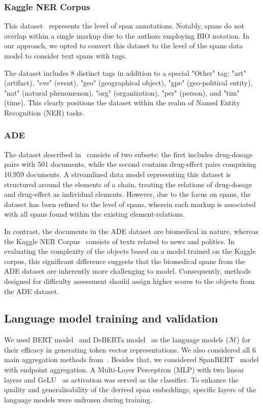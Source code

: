 \documentclass{article}
\begin{document}
\subsubsection{Kaggle NER Corpus}
This dataset~\cite{kagglener} represents the level of span annotations. Notably, spans do not overlap within a single markup due to the authors employing BIO notation. In our approach, we opted to convert this dataset to the level of the spans data model to consider text spans with tags.

The dataset includes 8 distinct tags in addition to a special "Other" tag: "art" (artifact), "eve" (event), "geo" (geographical object), "gpe" (geo-political entity), "nat" (natural phenomenon), "org" (organization), "per" (person), and "tim" (time). This clearly positions the dataset within the realm of Named Entity Recognition (NER) tasks.

\subsubsection{ADE}
The dataset described in~\cite{ade} consists of two subsets: the first includes drug-dosage pairs with 501 documents, while the second contains drug-effect pairs comprising 10,959 documents. A streamlined data model representing this dataset is structured around the elements of a chain, treating the relations of drug-dosage and drug-effect as individual elements. However, due to the focus on spans, the dataset has been refined to the level of spans, wherein each markup is associated with all spans found within the existing element-relations.

In contrast, the documents in the ADE dataset are biomedical in nature, whereas the Kaggle NER Corpus~\cite{kagglener} consists of texts related to news and politics. In evaluating the complexity of the objects based on a model trained on the Kaggle corpus, this significant difference suggests that the biomedical spans from the ADE dataset are inherently more challenging to model. Consequently, methods designed for difficulty assessment should assign higher scores to the objects from the ADE dataset.

\subsection{Language model training and validation}
We used BERT model~\cite{devlin2019bert} and DeBERTa model~\cite{hedeberta} as the language models ($\mathcal{M}$) for their efficacy in generating token vector representations. We also considered all 6 main aggregation methods from~\cite{toshniwal2020cross}. Besides that, we considered SpanBERT~\cite{joshi2020spanbert} model with endpoint aggregation. A Multi-Layer Perceptron (MLP) with two linear layers and GeLU~\cite{gelu} as activation was served as the classifier. To enhance the quality and generalisability of the derived span embeddings, specific layers of the language models were unfrozen during training.
\end{document}

